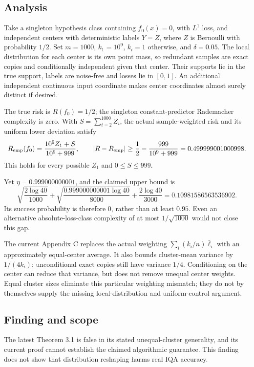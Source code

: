 \documentclass[11pt]{article}
\begin{document}
\subsection*{Analysis}

Take a singleton hypothesis class containing \(f_0(x)=0\), with \(L^1\) loss, and independent centers with deterministic labels \(Y=Z\), where \(Z\) is Bernoulli with probability \(1/2\). Set \(m=1000\), \(k_1=10^9\), \(k_i=1\) otherwise, and \(\delta=0.05\). The local distribution for each center is its own point mass, so redundant samples are exact copies and conditionally independent given that center. Their supports lie in the true support, labels are noise-free and losses lie in \([0,1]\). An additional independent continuous input coordinate makes center coordinates almost surely distinct if desired.

The true risk is \(R(f_0)=1/2\); the singleton constant-predictor Rademacher complexity is zero. With \(S=\sum_{i=2}^{1000}Z_i\), the actual sample-weighted risk and its uniform lower deviation satisfy \[R_{\rm emp}(f_0)=\frac{10^9 Z_1+S}{10^9+999},\qquad |R-R_{\rm emp}|\ge\frac12-\frac{999}{10^9+999}=0.499999001000998.\] This holds for every possible \(Z_1\) and \(0\le S\le999\).

Yet \(\eta=0.999000000001\), and the claimed upper bound is \[\sqrt{\frac{2\log40}{1000}}+\sqrt{\frac{0.999000000001\log40}{8000}}+\frac{2\log40}{3000}=0.10981586563536902.\] Its success probability is therefore \(0\), rather than at least \(0.95\). Even an alternative absolute-loss-class complexity of at most \(1/\sqrt{1000}\) would not close this gap.

The current Appendix C replaces the actual weighting \(\sum_i(k_i/n)\bar\ell_i\) with an approximately equal-center average. It also bounds cluster-mean variance by \(1/(4k_i)\); unconditional exact copies still have variance \(1/4\). Conditioning on the center can reduce that variance, but does not remove unequal center weights. Equal cluster sizes eliminate this particular weighting mismatch; they do not by themselves supply the missing local-distribution and uniform-control argument.

\subsection*{Finding and scope}

The latest Theorem 3.1 is false in its stated unequal-cluster generality, and its current proof cannot establish the claimed algorithmic guarantee. This finding does not show that distribution reshaping harms real IQA accuracy.
\end{document}
